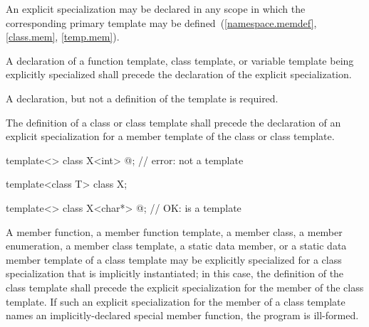 \pnum
An explicit specialization
may be declared in any scope in which the corresponding primary template
may be defined~(\ref{namespace.memdef}, \ref{class.mem}, \ref{temp.mem}).

\pnum
A declaration of a function template, class template, or variable template being explicitly
specialized shall precede the declaration of
the explicit
specialization.
\begin{note}
A declaration, but not a definition of the template is required.
\end{note}
The definition of a class or class template shall precede the
declaration of an explicit specialization for a member template of the class
or class template.
\begin{example}

\begin{codeblock}
template<> class X<int> { @\commentellip@ };          // error:  not a template

template<class T> class X;

template<> class X<char*> { @\commentellip@ };        // OK:  is a template
\end{codeblock}
\end{example}

\pnum
A member function, a member function template, a member class,
a member enumeration, a
member class template,
a static data member, or a static data member template of a class template
may be explicitly specialized for a class specialization that is implicitly
instantiated;
in this case, the definition of the class template shall
precede the explicit specialization for the member of the class
template.
If such an explicit specialization for the member of a class template names an
implicitly-declared special member function,
the program is ill-formed.

